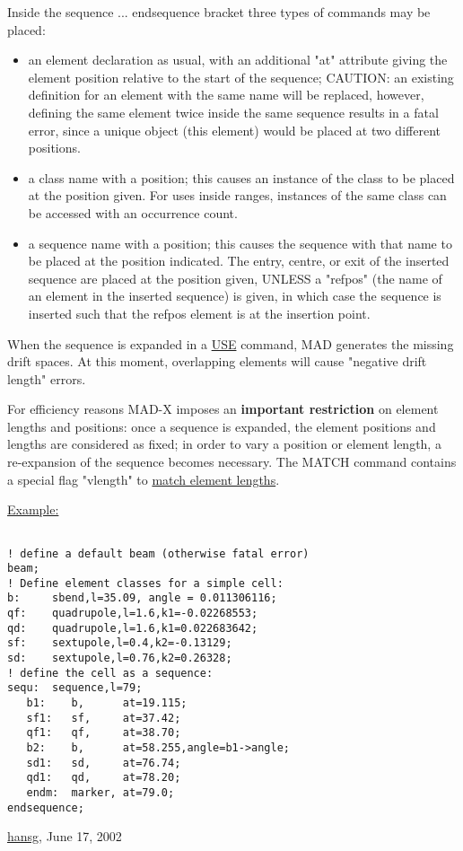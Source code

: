  Inside the sequence ... endsequence bracket three types of commands may be placed: 
\begin{itemize}
	\item an element declaration as usual, with an additional "at" attribute giving the element position relative to the start of the sequence; CAUTION: an existing definition for an element with the same name will be replaced, however, defining the same element twice inside the same sequence results in a fatal error, since a unique object (this element) would be placed at two different positions.
	\item a class name with a position; this causes an instance of the class to be placed at the position given. For uses inside ranges, instances of the same class can be accessed with an occurrence count.
	\item a sequence name with a position; this causes the sequence with that name to be placed at the position indicated. The entry, centre, or exit of the inserted sequence are placed at the position given, UNLESS a "refpos" (the name of an element in the inserted sequence) is given, in which case the sequence is inserted such that the refpos element is  at the insertion point.
\end{itemize} When the sequence is expanded in a  \href{../control/general.html#use}{USE} command, MAD generates the missing drift spaces. At this moment, overlapping elements will cause "negative drift length" errors. 

 For efficiency reasons MAD-X imposes an \textbf{important restriction} on element lengths and positions: once a sequence is expanded, the element positions and lengths are considered as fixed; in order to vary a position or element length, a re-expansion of the sequence becomes necessary. The MATCH command contains a special flag "vlength" to \href{../match/match.html}{match element lengths}. 

\href{example}{Example:}
\begin{verbatim}

! define a default beam (otherwise fatal error)
beam;
! Define element classes for a simple cell:
b:     sbend,l=35.09, angle = 0.011306116;
qf:    quadrupole,l=1.6,k1=-0.02268553;
qd:    quadrupole,l=1.6,k1=0.022683642;
sf:    sextupole,l=0.4,k2=-0.13129;
sd:    sextupole,l=0.76,k2=0.26328;
! define the cell as a sequence:
sequ:  sequence,l=79;
   b1:    b,      at=19.115;
   sf1:   sf,     at=37.42;
   qf1:   qf,     at=38.70;
   b2:    b,      at=58.255,angle=b1->angle;
   sd1:   sd,     at=76.74;
   qd1:   qd,     at=78.20;
   endm:  marker, at=79.0;
endsequence;
\end{verbatim}\href{http://www.cern.ch/Hans.Grote/hansg_sign.html}{hansg}, June 17, 2002 

